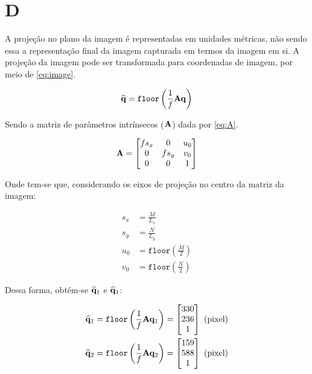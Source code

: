 \section{D}

A projeção no plano da imagem é representadas em unidades métricas, não sendo essa a representação final da imagem capturada em termos da imagem em si. A projeção da imagem pode ser transformada para coordenadas de imagem, por meio de \eqref{eq:image}.

\begin{equation}\label{eq:image}
	\widehat{\mathbf{q}} = \texttt{floor}\left(\frac{1}{f}\mathbf{A}\mathbf{q}\right)
\end{equation}

Sendo a matriz de parâmetros intrínsecos ($\mathbf{A}$) dada por \eqref{eq:A}.

\begin{equation}\label{eq:A}
	\mathbf{A} = \begin{bmatrix}
		fs_x & 0 & u_0 \\
		0 & fs_y & v_0\\
		0 & 0 & 1
	\end{bmatrix}
\end{equation}

Onde tem-se que, considerando os eixos de projeção no centro da matriz da imagem:

\begin{align}
	s_x &= \frac{M}{L_x} \\
	s_y &= \frac{N}{L_y} \\
	u_0 &= \texttt{floor}\left(\frac{M}{2}\right)  \\
	v_0 &= \texttt{floor}\left(\frac{N}{2}\right)  
\end{align}

Dessa forma, obtém-se $\widehat{\mathbf{q}}_1$ e $\widehat{\mathbf{q}}_1$:

\begin{align}
	\widehat{\mathbf{q}}_1 &= \texttt{floor}\left(\frac{1}{f}\mathbf{A}\mathbf{q}_1\right) = \begin{bmatrix}
		330\\
		236\\
		1
	\end{bmatrix}  \text{ (pixel)}\\
	\widehat{\mathbf{q}}_2 &= \texttt{floor}\left(\frac{1}{f}\mathbf{A}\mathbf{q}_2\right)  = \begin{bmatrix}
		159\\
		588\\
		1
	\end{bmatrix}  \text{ (pixel)}
\end{align}

